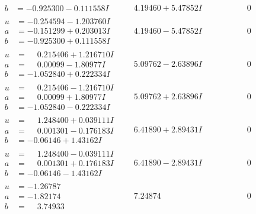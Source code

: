 \documentclass[1p]{elsarticle_modified}
\theoremstyle{definition}
\begin{document}
$$\begin{array}{c|c|c}
\begin{aligned}
b &= -0.925300 - 0.111558 I\end{aligned}
 & \phantom{-}4.19460 + 5.47852 I & \phantom{-0.000000 } 0 \\ \hline\begin{aligned}
u &= -0.254594 - 1.203760 I \\
a &= -0.151299 + 0.203013 I \\
b &= -0.925300 + 0.111558 I\end{aligned}
 & \phantom{-}4.19460 - 5.47852 I & \phantom{-0.000000 } 0 \\ \hline\begin{aligned}
u &= \phantom{-}0.215406 + 1.216710 I \\
a &= \phantom{-}0.00099 - 1.80977 I \\
b &= -1.052840 + 0.222334 I\end{aligned}
 & \phantom{-}5.09762 - 2.63896 I & \phantom{-0.000000 } 0 \\ \hline\begin{aligned}
u &= \phantom{-}0.215406 - 1.216710 I \\
a &= \phantom{-}0.00099 + 1.80977 I \\
b &= -1.052840 - 0.222334 I\end{aligned}
 & \phantom{-}5.09762 + 2.63896 I & \phantom{-0.000000 } 0 \\ \hline\begin{aligned}
u &= \phantom{-}1.248400 + 0.039111 I \\
a &= \phantom{-}0.001301 - 0.176183 I \\
b &= -0.06146 + 1.43162 I\end{aligned}
 & \phantom{-}6.41890 + 2.89431 I & \phantom{-0.000000 } 0 \\ \hline\begin{aligned}
u &= \phantom{-}1.248400 - 0.039111 I \\
a &= \phantom{-}0.001301 + 0.176183 I \\
b &= -0.06146 - 1.43162 I\end{aligned}
 & \phantom{-}6.41890 - 2.89431 I & \phantom{-0.000000 } 0 \\ \hline\begin{aligned}
u &= -1.26787\phantom{ +0.000000I} \\
a &= -1.82174\phantom{ +0.000000I} \\
b &= \phantom{-}3.74933\phantom{ +0.000000I}\end{aligned}
 & \phantom{-}7.24874\phantom{ +0.000000I} & \phantom{-0.000000 } 0 \\ \hline\begin{aligned}

\end{aligned}
\end{array}$$
\end{document}
